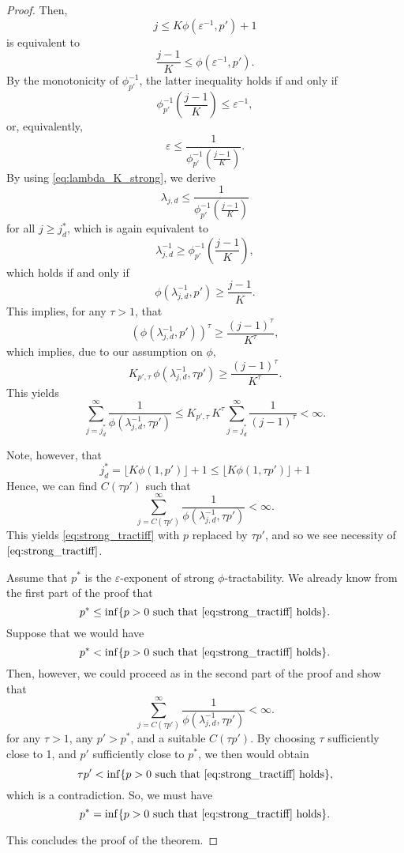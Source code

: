 \documentclass[11pt,a4paper]{article}
\begin{document}
\begin{proof}
Then, 
\[
j \le K \phi(\varepsilon^{-1},p')+1
\]
is equivalent to
\[
\frac{j-1}{K} \le \phi(\varepsilon^{-1},p').
\]
By the monotonicity of $\phi_{p'}^{-1}$, the latter inequality holds if and only if
\[
  \phi_{p'}^{-1} \left(\frac{j-1}{K} \right)
  \le \varepsilon^{-1},
\]
or, equivalently,
\[
 \varepsilon \le \frac{1}{\phi_{p'}^{-1} \left(\frac{j-1}{K} \right)}.
\]
By using \eqref{eq:lambda_K_strong}, we derive
\[
 \lambda_{j,d}\le \frac{1}{\phi_{p'}^{-1} \left(\frac{j-1}{K} \right)}
\]
for all $j\ge j_d^*$, which is again equivalent to 
\[
\lambda_{j,d}^{-1}\ge \phi_{p'}^{-1} \left(\frac{j-1}{K} \right),
\]
which holds if and only if
\[ 
 \phi (\lambda_{j,d}^{-1}, p') \ge \frac{j-1}{K}.
\]
This implies, for any $\tau>1$, that 
\[ 
 (\phi (\lambda_{j,d}^{-1}, p'))^\tau \ge \frac{(j-1)^\tau}{K^\tau },
\]
which implies, due to our assumption on $\phi$, 
\[ 
 K_{p',\tau}\,\phi (\lambda_{j,d}^{-1}, \tau p') \ge \frac{(j-1)^\tau}{K^\tau }.
\]
This yields
\[
\sum_{j=j_d^*}^\infty \frac{1}{\phi (\lambda_{j,d}^{-1}, \tau p')} \le K_{p',\tau}\, K^\tau \sum_{j=j_d^*}^\infty \frac{1}{(j-1)^\tau}<\infty.
\]

Note, however, that 
\[
 j_d^* = \lfloor K \phi(1,p')\rfloor +1 \le \lfloor K \phi(1,\tau p')\rfloor +1
\]
Hence, we can find $C(\tau p')$ such that 
\[
 \sum_{j=C(\tau p')}^\infty \frac{1}{\phi (\lambda_{j,d}^{-1}, \tau p')}<\infty.
\]
This yields \eqref{eq:strong_tractiff} with $p$ replaced by $\tau p'$, and so we see necessity of $\eqref{eq:strong_tractiff}$. 

\bigskip

Assume that $p^*$ is the $\varepsilon$-exponent of strong $\phi$-tractability. We already know from the first part of the proof that 
\[
 p^* \le \inf\{p>0\ \mbox{such that \eqref{eq:strong_tractiff} holds}\}.
\]
Suppose that we would have 
\[
 p^* < \inf\{p>0\ \mbox{such that \eqref{eq:strong_tractiff} holds}\}.
\]
Then, however, we could proceed as in the second part of the proof and show that 
\[
 \sum_{j=C(\tau p')}^\infty \frac{1}{\phi (\lambda_{j,d}^{-1}, \tau p')}<\infty.
\]
for any $\tau>1$, any $p'>p^*$, and a suitable $C(\tau p')$. By choosing $\tau$ sufficiently close to 1, and $p'$ sufficiently close to $p^*$, we then would 
obtain 
\[
 \tau p' < \inf\{p>0\ \mbox{such that \eqref{eq:strong_tractiff} holds}\},
\]
which is a contradiction. So, we must have 
\[
 p^* = \inf\{p>0\ \mbox{such that \eqref{eq:strong_tractiff} holds}\}.
\]

This concludes the proof of the theorem. 
\end{proof}
\end{document}
